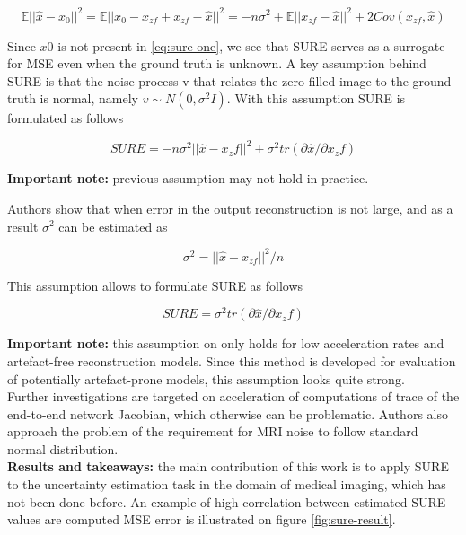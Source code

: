 \begin{equation}
    \mathbb{E}|| \hat{x} - x_0 ||^2 = \mathbb{E} || x_0 - x_{zf} + x_{zf} - \hat{x} ||^2 = -n \sigma^2  + \mathbb{E} || x_{zf} - \hat{x} ||^2 + 2Cov(x_{zf}, \hat{x})
    \label{eq:sure-one}
\end{equation} 

Since $x0$ is not present in \ref{eq:sure-one}, we see that SURE serves as a surrogate for MSE even when the ground truth is unknown. 
A key assumption behind SURE is that the noise process v that relates the zero-filled image to the ground truth is normal, namely $v \sim N(0, \sigma^2
I)$. 
With this assumption SURE is formulated as follows 

\begin{equation}
    SURE = -n \sigma^2 || \hat{x} - x_zf ||^2 + \sigma^2 tr(\partial \hat{x} / \partial x_zf)
\end{equation}

\textbf{Important note:} previous assumption may not hold in practice. 

Authors show that when error in the output reconstruction is not large, and as a result $\sigma^2$ can be estimated as 

\begin{equation}
    \sigma^2 = || \hat{x} - x_{zf} ||^2  / n
\end{equation} 

This assumption allows to formulate SURE as follows 

\begin{equation}
    SURE = \sigma^2 tr(\partial \hat{x} / \partial x_zf)
\end{equation} 

\textbf{Important note:} this assumption on only holds for low acceleration rates and artefact-free reconstruction models. 
Since this method is developed for evaluation of potentially artefact-prone models, this assumption looks quite strong. \\

Further investigations are targeted on acceleration of computations of trace of the end-to-end network Jacobian, which otherwise can be problematic. 
Authors also approach the problem of the requirement for MRI noise to follow standard normal distribution. \\

{\bf Results and takeaways:} the main contribution of this work is to apply SURE to the uncertainty estimation task in the domain of medical imaging, which has not been done before. 
An example of high correlation between estimated SURE values are computed MSE error is illustrated on figure \ref{fig:sure-result}.

